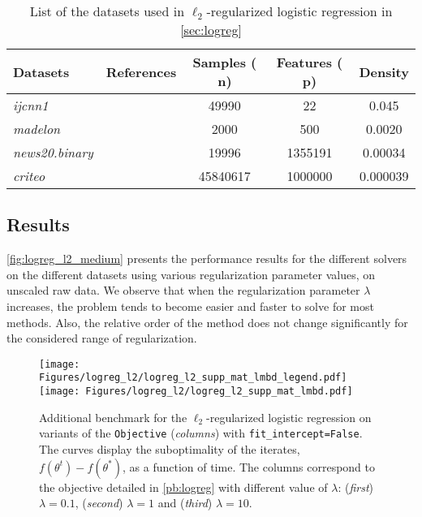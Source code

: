 \documentclass{article}
\newlength{\figwidth}
\begin{document}
\begin{table}[h]
  \centering
  \caption{List of the datasets used in $\ell_2$-regularized logistic regression in \autoref{sec:logreg}}
      \begin{tabular}{llS[table-format=8.0]S[table-format=7.0]S[table-format=1.1e-1,scientific-notation=true]}
        \toprule
        \textbf{Datasets} & \textbf{References} &{\textbf{Samples ($\mathbf{n}$)}} & {\textbf{Features ($\mathbf{p}$)}} & {\textbf{Density}} \\
        \midrule
        \emph{ijcnn1} &\citet{ijcnn1} & 49990 & 22 & 0.045 \\
        \emph{madelon} &\citet{madelon} & 2000 & 500 & 0.0020  \\
        \emph{news20.binary} &\citet{news20} & 19996 & 1355191 & 0.00034 \\
\emph{criteo} &\citet{Criteo_15}  &  45840617 & 1000000 &  0.000039 \\
\bottomrule
    \end{tabular}
    \label{table:summary_data_logreg}
\end{table}


\subsection{Results}

\autoref{fig:logreg_l2_medium} presents the performance results for the different solvers on the different datasets using various regularization parameter values, on unscaled raw data.
We observe that when the regularization parameter $\lambda$ increases, the problem tends to become easier and faster to solve for most methods.
Also, the relative order of the method does not change significantly for the considered range of regularization.


\begin{figure}[t]
    \centering
    \texttt{[image: Figures/logreg\_l2/logreg\_l2\_supp\_mat\_lmbd\_legend.pdf]}
    \texttt{[image: Figures/logreg\_l2/logreg\_l2\_supp\_mat\_lmbd.pdf]}
    \caption{
        Additional benchmark for the $\ell_2$-regularized logistic regression on variants of the \texttt{Objective} (\emph{columns}) with \texttt{fit\_intercept=False}.
        The curves display the suboptimality of the iterates, $f(\theta^t) - f(\theta^*)$, as a function of time.
        The columns correspond to the objective detailed in \autoref{pb:logreg} with different value of $\lambda$: (\emph{first}) $\lambda = 0.1$, (\emph{second}) $\lambda = 1$ and (\emph{third}) $\lambda=10$.
    }
    \label{fig:logreg_l2_medium}
\end{figure}\clearpage{}
\end{document}
